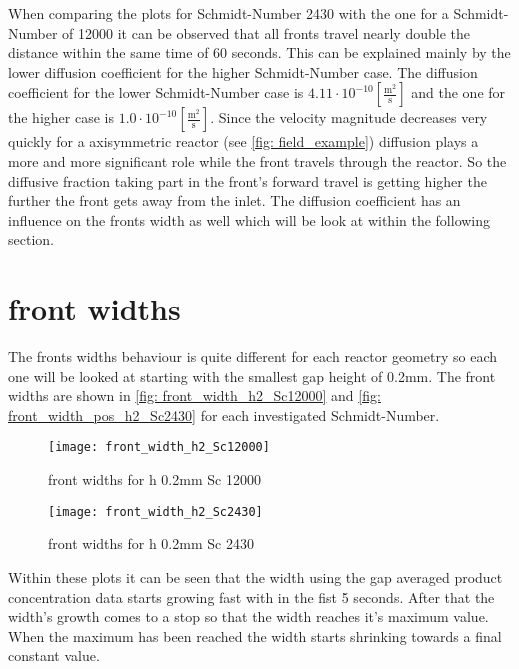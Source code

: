 \documentclass[../thesis.tex]{subfiles}
\begin{document}
When comparing the plots for Schmidt-Number 2430 with the one for a Schmidt-Number of 12000 it can be observed that all fronts travel nearly double the distance within the same time of 60 seconds. This can be explained mainly by the lower diffusion coefficient for the higher Schmidt-Number case. The diffusion coefficient for the lower Schmidt-Number case is $4 \text{.}11 \cdot 10^{-10} \left[ \frac{\mathrm{m^2}}{\mathrm{s}} \right]$ and the one for the higher case is $1\text{.}0 \cdot 10^{-10} \left[ \frac{\mathrm{m^2}}{\mathrm{s}} \right]$.
Since the velocity magnitude decreases very quickly for a axisymmetric reactor (see \autoref{fig: field_example}) diffusion plays a more and more significant role while the front travels through the reactor. So the diffusive fraction taking part in the front's forward travel is getting higher the further the front gets away from the inlet. The diffusion coefficient has an influence on the fronts width as well which will be look at within the following section.

\section{front widths}

The fronts widths behaviour is quite different for each reactor geometry so each one will be looked at starting with the smallest gap height of 0.2mm. The front widths are shown in \autoref{fig: front_width_h2_Sc12000} and \autoref{fig: front_width_pos_h2_Sc2430} for each investigated Schmidt-Number.

\begin{figure}[htbp]
	\centering
	\texttt{[image: front\_width\_h2\_Sc12000]}
	\caption{front widths for h 0.2mm Sc 12000\label{fig: front_width_h2_Sc12000}}\bigskip
	\texttt{[image: front\_width\_h2\_Sc2430]}
	\caption{front widths for h 0.2mm Sc 2430\label{fig: front_width_pos_h2_Sc2430}}
\end{figure}

Within these plots it can be seen that the width using the gap averaged product concentration data starts growing fast with in the fist 5 seconds. After that the width's growth comes to a stop so that the width reaches it's maximum value. When the maximum has been reached the width starts shrinking towards a final constant value.
\end{document}
